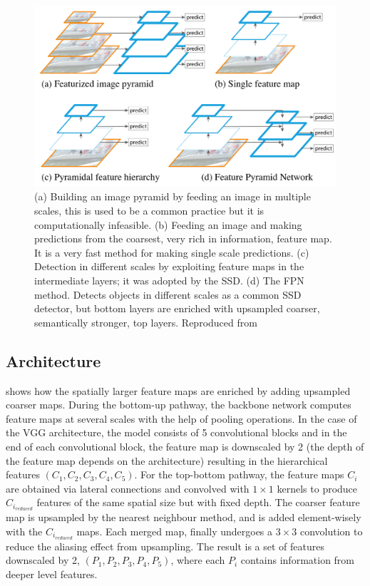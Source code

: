 \begin{figure}[!htb]
  \centering
  \includegraphics[width=12cm]{images/ch2/fig9.png}
  \caption{(a) Building an image pyramid by feeding an image in multiple scales, this is used to be a common practice but it is computationally infeasible. (b) Feeding an image and making predictions from the coarsest, very rich in information, feature map. It is a very fast method for making single scale predictions. (c) Detection in different scales by exploiting feature maps in the intermediate layers; it was adopted by the SSD. (d) The FPN method. Detects objects in different scales as a common SSD detector, but bottom layers are enriched with upsampled coarser, semantically stronger, top layers. Reproduced from \cite{lin2017feature}}
  \label{fig9}
\end{figure} 

\subsection{Architecture}
 shows how the spatially larger feature maps are enriched by adding upsampled coarser maps. During the bottom-up pathway, the backbone network computes feature maps at several scales with the help of pooling operations. In the case of the VGG architecture, the model consists of 5 convolutional blocks and in the end of each convolutional block, the feature map is downscaled by 2 (the depth of the feature map depends on the architecture) resulting in the hierarchical features $(C_1, C_2, C_3, C_4, C_5)$. For the top-bottom pathway, the feature maps $C_i$ are obtained via lateral connections and convolved with $1\times1$ kernels to produce $C_{i_{reduced}}$ features of the same spatial size but with fixed depth. The coarser feature map is upsampled by the nearest neighbour method, and is added element-wisely with the $C_{i_{reduced}}$ maps. Each merged map, finally undergoes a $3\times3$ convolution to reduce the aliasing effect from upsampling. The result is a set of features downscaled by 2, $(P_1,P_2,P_3,P_4,P_5)$, where each $P_i$ contains information from deeper level features. 


